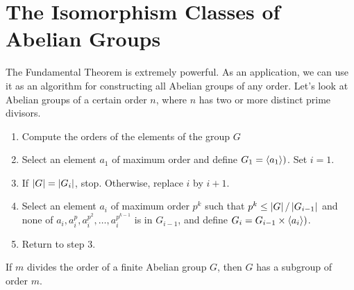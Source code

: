 \section{The Isomorphism Classes of Abelian Groups}

\begin{remark}
	The Fundamental Theorem is extremely powerful. As an application, we can use it as an algorithm for constructing all Abelian groups of any order. Let's look at Abelian groups of a certain order $n$, where $n$ has two or more distinct prime divisors.
	\begin{enumerate}
		\item Compute the orders of the elements of the group $G$
		\item Select an element $a_1$ of maximum order and define $G_1 = \langle a_1 \rangle)$. Set $i = 1$.
		\item If $\left\lvert G \right\rvert = \left\lvert G_i \right\rvert$, stop. Otherwise, replace $i$ by $i + 1$.
		\item Select an element $a_i$ of maximum order $p^k$ such that $p^k \leq \left\lvert G \right\rvert/\left\lvert G_{i-1} \right\rvert$ and none of $a_i, a^p_i,a^{p^2}_i, \dots, a^{p^{k-1}}_i$ is in $G_{i-1}$, and define $G_i=G_{i-1} \times \langle a_i \rangle)$.
		\item Return to step 3.
	\end{enumerate}
\end{remark}

\begin{corollary}
	If $m$ divides the order of a finite Abelian group $G$, then $G$ has a subgroup of order $m$.
\end{corollary}
